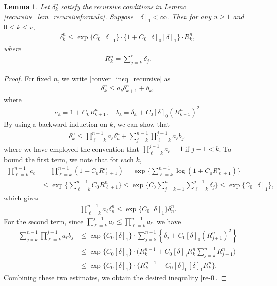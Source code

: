 \documentclass[reqno,12pt]{amsart} %
\newtheorem{lemma}[theorem]{Lemma}
\theoremstyle{definition}
\theoremstyle{remark}
\numberwithin{equation}{section}
\begin{document}
\begin{lemma}\label{conver_lemma_dkn}
  Let $\delta_k^n$ satisfy the recursive conditions in Lemma \ref{recursive_lem_recursiveformula}. Suppose $[\delta]_1<\infty$. Then for any $n\geq 1$ and $0\le k\leq n$, 
  \begin{align}\label{re-0}
    \delta_k^n\leq \exp\big\{C_0[\delta]_1\big\}\cdot \big\{ 1+C_0[\delta]_0[\delta]_1\big\}\cdot R_k^n,
  \end{align}
  where
  \begin{align}
    \label{conver_def_Rkn}
    R_k^n=\sum_{j=k}^n\delta_j. 
  \end{align}
\end{lemma}
\begin{proof}
For fixed $n$, we write \eqref{conver_ineq_recursive} as
\begin{align*}
  \delta_k^n\leq a_k\delta_{k+1}^n+b_k,
\end{align*}
where
\begin{align*}
    a_k=1+C_0R_{k+1}^n,\quad b_k=\delta_k+C_0[\delta]_0 (R_{k+1}^n)^2.
\end{align*}
By using a backward induction on $k$, we can show that  
\begin{align*}
  \delta_k^n\leq \prod_{\ell=k}^{n-1}a_\ell \delta_n^n+\sum_{j=k}^{n-1} \prod_{\ell=k}^{j-1}a_\ell b_j,
\end{align*}
where we have employed the convention that $\prod_{\ell=k}^{j-1}a_\ell=1$ if $j-1<k$. To bound the first term, we note that  for each $k$, 
\begin{align*}
    \prod_{\ell=k}^{n-1} a_\ell&=\prod_{\ell=k}^{n-1}(1+C_0R_{\ell+1}^n)=\exp\bigg\{\sum_{\ell=k}^{n-1} \log(1+C_0R_{\ell+1}^n)\bigg\}\\
    &\leq \exp\bigg\{\sum_{\ell=k}^{n-1} C_0R_{\ell+1}^n\bigg\}
    \leq \exp\bigg\{C_0\sum_{j=k+1}^n\sum_{\ell=k}^{j-1} \delta_j\bigg\}\leq \exp\big\{C_0[\delta]_1\big\},
  \end{align*}
which gives
\begin{align*}
  \prod_{\ell=k}^{n-1} a_\ell \delta_n^n\leq \exp\big\{C_0[\delta]_1\big\}\delta_n^n.
\end{align*}
  For the second term, since $\prod_{\ell=k}^{j-1} a_\ell\leq \prod_{\ell=k}^{n-1}a_\ell$, we have
  \begin{align*}
    \sum_{j=k}^{n-1}\prod_{\ell=k}^{j-1}a_\ell b_j&\leq \exp\big\{C_0[\delta]_1\big\}\cdot \sum_{j=k}^{n-1} \left\{\delta_j+C_0[\delta]_0 (R_{j+1}^n)^2\right\}\\
    &\leq \exp\big\{C_0[\delta]_1\big\}\cdot \bigg(R_k^{n-1}+C_0[\delta]_0 R_k^n\sum_{j=k}^{n-1} R_{j+1}^n\bigg)\\&\leq \exp\big\{C_0[\delta]_1\big\}\cdot \big\{R_k^{n-1}+C_0[\delta]_0[\delta]_1R_k^n\big\}. 
  \end{align*}
Combining these two estimates,  we obtain the desired inequality \eqref{re-0}.
\end{proof}
\end{document}
